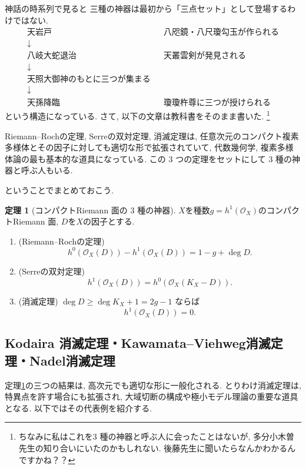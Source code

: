 \documentclass[dvipdfmx,a4paper,11pt]{article} %
\theoremstyle{definition}
\newtheorem{thm}{定理}[section]
\numberwithin{equation}{section}
\begin{document}
神話の時系列で見ると
三種の神器は最初から「三点セット」として登場するわけではない. 
\[
\boxed{
\begin{array}{ccl}
\text{天岩戸} &&
\text{八咫鏡・八尺瓊勾玉が作られる}\\[2mm]
\downarrow &&\\
\text{八岐大蛇退治} &&
\text{天叢雲剣が発見される}\\[2mm]
\downarrow &&\\
\text{天照大御神のもとに三つが集まる}&&\\
\downarrow &&\\
\text{天孫降臨} &&
\text{瓊瓊杵尊に三つが授けられる}
\end{array}}
\]
という構造になっている.
さて, 以下の文章は教科書をそのまま書いた. \footnote{ちなみに私はこれを$3$ 種の神器と呼ぶ人に会ったことはないが, 多分小木曽先生の知り合いにいたのかもしれない. 後藤先生に聞いたらなんかわかるんですかね？？}

\begin{tcolorbox}[mybox]
\label{O-M303}
Riemann--Rochの定理, Serreの双対定理, 消滅定理は, 任意次元のコンパクト複素多様体とその因子に対しても適切な形で拡張されていて, 代数幾何学, 複素多様体論の最も基本的な道具になっている. この $3$ つの定理をセットにして $3$ 種の神器と呼ぶ人もいる.
\end{tcolorbox}

ということでまとめておこう. 

\begin{thm}[コンパクトRiemann 面の $3$ 種の神器]
\label{O-M-summary}
$X$を種数$g=h^1(\mathcal O_X)$のコンパクトRiemann 面, $D$を$X$の因子とする.
\begin{enumerate}
\item (Riemann--Rochの定理) 
$$ h^0(\mathcal O_X(D))-h^1(\mathcal O_X(D))=1-g+\deg D.$$
\item (Serreの双対定理)$$h^1(\mathcal O_X(D))=h^0(\mathcal O_X(K_X-D)).$$
\item (消滅定理) $\deg D\geq \deg K_X+1=2g-1$ ならば $$h^1(\mathcal O_X(D))=0.$$
\end{enumerate}
\end{thm}

\subsection{Kodaira 消滅定理・Kawamata--Viehweg消滅定理・Nadel消滅定理}

定理\ref{O-M-summary}の三つの結果は, 高次元でも適切な形に一般化される. とりわけ消滅定理は, 特異点を許す場合にも拡張され, 大域切断の構成や極小モデル理論の重要な道具となる. 以下ではその代表例を紹介する.
\end{document}
